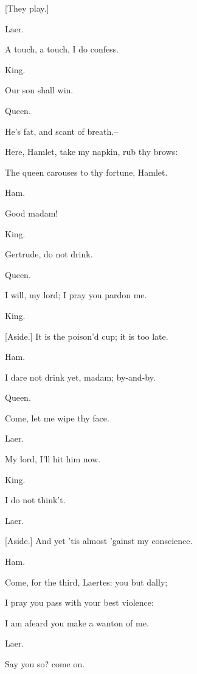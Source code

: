 \documentclass[12pt]{book}
\begin{document}
[They play.]



Laer.

A touch, a touch, I do confess.



King.

Our son shall win.



Queen.

He's fat, and scant of breath.--

Here, Hamlet, take my napkin, rub thy brows:

The queen carouses to thy fortune, Hamlet.



Ham.

Good madam!



King.

Gertrude, do not drink.



Queen.

I will, my lord; I pray you pardon me.



King.

[Aside.] It is the poison'd cup; it is too late.



Ham.

I dare not drink yet, madam; by-and-by.



Queen.

Come, let me wipe thy face.



Laer.

My lord, I'll hit him now.



King.

I do not think't.



Laer.

[Aside.] And yet 'tis almost 'gainst my conscience.



Ham.

Come, for the third, Laertes: you but dally;

I pray you pass with your best violence:

I am afeard you make a wanton of me.



Laer.

Say you so? come on.
\end{document}
